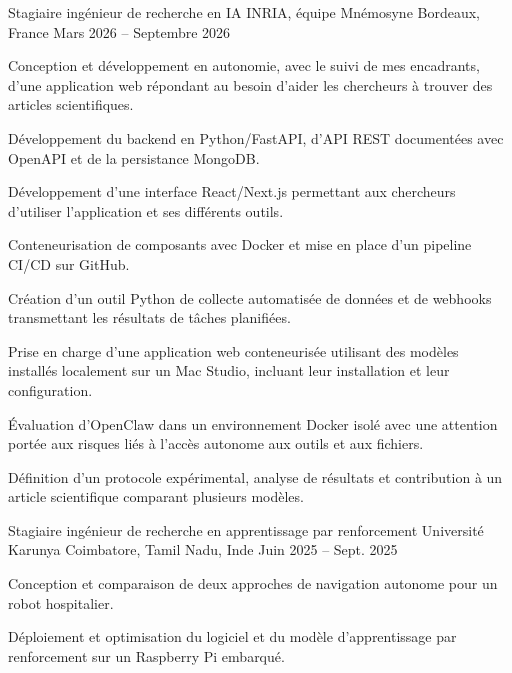 
\begin{cventries}
  \cventry
    {Stagiaire ingénieur de recherche en IA}
    {INRIA, équipe Mnémosyne}
    {Bordeaux, France}
    {Mars 2026 -- Septembre 2026}
    {
      \begin{cvitems}
        \item {Conception et développement en autonomie, avec le suivi de mes encadrants, d’une application web répondant au besoin d’aider les chercheurs à trouver des articles scientifiques.}
        \item {Développement du backend en Python/FastAPI, d’API REST documentées avec OpenAPI et de la persistance MongoDB.}
        \item {Développement d’une interface React/Next.js permettant aux chercheurs d’utiliser l’application et ses différents outils.}
        \item {Conteneurisation de composants avec Docker et mise en place d’un pipeline CI/CD sur GitHub.}
        \item {Création d’un outil Python de collecte automatisée de données et de webhooks transmettant les résultats de tâches planifiées.}
        \item {Prise en charge d’une application web conteneurisée utilisant des modèles installés localement sur un Mac Studio, incluant leur installation et leur configuration.}
        \item {Évaluation d’OpenClaw dans un environnement Docker isolé avec une attention portée aux risques liés à l’accès autonome aux outils et aux fichiers.}
        \item {Définition d’un protocole expérimental, analyse de résultats et contribution à un article scientifique comparant plusieurs modèles.}
      \end{cvitems}
    }

  \cventry
    {Stagiaire ingénieur de recherche en apprentissage par renforcement}
    {Université Karunya}
    {Coimbatore, Tamil Nadu, Inde}
    {Juin 2025 -- Sept. 2025}
    {
      \begin{cvitems}
        \item {Conception et comparaison de deux approches de navigation autonome pour un robot hospitalier.}
        \item {Déploiement et optimisation du logiciel et du modèle d’apprentissage par renforcement sur un Raspberry Pi embarqué.}
      \end{cvitems}
    }
\end{cventries}
